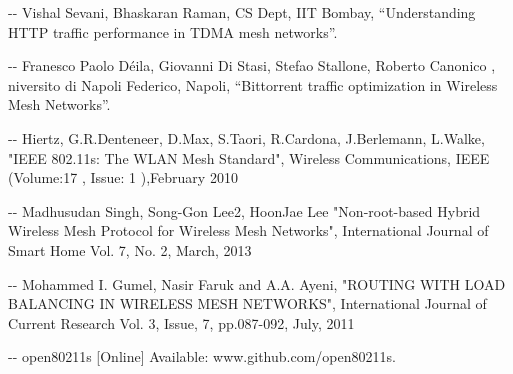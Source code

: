 \documentclass[12pt]{article}
\makeatletter
\newenvironment{indentation}[3]%
	{\par\setlength{\parindent}{#3}
	\setlength{\leftmargin}{#1}       \setlength{\rightmargin}{#1}%
	\advance\linewidth -\leftmargin       \advance\linewidth -\rightmargin%
	\advance\@totalleftmargin\leftmargin  \@setpar{{\@@par}}%
	\parshape 1\@totalleftmargin \linewidth\ignorespaces}{\par}%
\makeatother
\begin{document}
\vspace{1cm} 

\begin{indentation}{0pt}{0pt}{0pt}
[3] Vishal Sevani, Bhaskaran Raman, CS Dept, IIT Bombay, “Understanding HTTP traffic performance in TDMA mesh networks”.
\end{indentation}

\vspace{1cm}

\begin{indentation}{0pt}{0pt}{0pt}
[4] Franesco Paolo Déila, Giovanni Di Stasi, Stefao Stallone, Roberto Canonico , niversito di Napoli Federico, Napoli, “Bittorrent traffic optimization in Wireless Mesh Networks”.
\end{indentation}

\vspace{1cm}

\begin{indentation}{0pt}{0pt}{0pt}
[5] Hiertz, G.R.Denteneer, D.Max, S.Taori, R.Cardona, J.Berlemann, L.Walke, "IEEE 802.11s: The WLAN Mesh Standard", Wireless Communications, IEEE  (Volume:17 ,  Issue: 1 ),February 2010
\end{indentation}

\vspace{1cm}

\begin{indentation}{0pt}{0pt}{0pt}
[6] Madhusudan Singh, Song-Gon Lee2, HoonJae Lee "Non-root-based Hybrid Wireless Mesh Protocol for Wireless Mesh Networks", International Journal of Smart Home Vol. 7, No. 2, March, 2013
\end{indentation}

\vspace{1cm}

\begin{indentation}{0pt}{0pt}{0pt}
[7] Mohammed I. Gumel, Nasir Faruk and A.A. Ayeni, "ROUTING WITH LOAD BALANCING IN WIRELESS MESH NETWORKS", International Journal of Current Research Vol. 3, Issue, 7, pp.087-092, July, 2011
\end{indentation}

\vspace{1cm}

\begin{indentation}{0pt}{0pt}{0pt}
[8] open80211s [Online] Available: www.github.com/open80211s.
\end{indentation}
\end{document}

